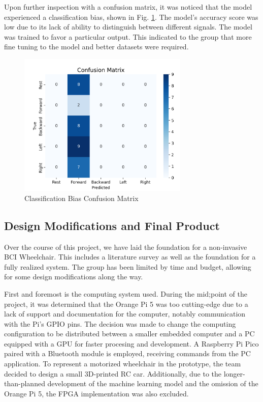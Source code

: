 \documentclass[conference]{IEEEtran}
\begin{document}
        Upon further inspection with a confusion matrix, it was noticed that the model experienced a classification bias, shown in Fig. \ref{fig:confused_confusion}. The model’s accuracy score was low due to its lack of ability to distinguish between different signals. The model was trained to favor a particular output. This indicated to the group that more fine tuning to the model and better datasets were required.  
        \begin{figure}[htbp]
            \centering
            \includegraphics[keepaspectratio, height=2.7in]{figs/paper/bad_confusion.png}
            \caption{Classification Bias Confusion Matrix}
            \label{fig:confused_confusion}
        \end{figure}

    \subsection{Design Modifications and Final Product}
        Over the course of this project, we have laid the foundation for a non-invasive BCI Wheelchair. This includes a literature survey as well as the foundation for a fully realized system. The group has been limited by time and budget, allowing for some design modifications along the way.

        First and foremost is the computing system used. During the mid;point of the project, it was determined that the Orange Pi 5 was too cutting-edge due to a lack of support and documentation for the computer, notably communication with the Pi's GPIO pins. The decision was made to change the computing configuration to be distributed between a smaller embedded computer and a PC equipped with a GPU for faster procesing and development. A Raspberry Pi Pico paired with a Bluetooth module is employed, receiving commands from the PC application. To represent a motorized wheelchair in the prototype, the team decided to design a small 3D-printed RC car. Additionally, due to the longer-than-planned development of the machine learning model and the omission of the Orange Pi 5, the FPGA implementation was also excluded.
\end{document}
